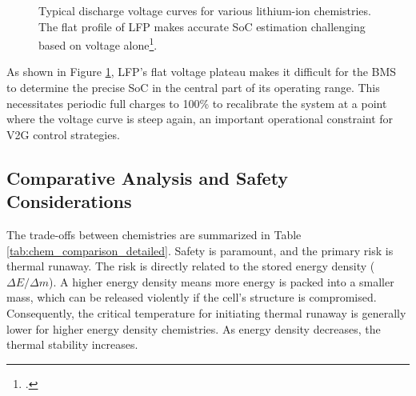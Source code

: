 \begin{figure}[h!]
    \centering
    \caption{Typical discharge voltage curves for various lithium-ion chemistries. The flat profile of LFP makes accurate SoC estimation challenging based on voltage alone\footcite{plett2015battery}.}
    \label{fig:voltage_curves_detailed}
\end{figure}

As shown in Figure \ref{fig:voltage_curves_detailed}, LFP's flat voltage plateau makes it difficult for the BMS to determine the precise SoC in the central part of its operating range. This necessitates periodic full charges to 100\% to recalibrate the system at a point where the voltage curve is steep again, an important operational constraint for V2G control strategies.

\subsection{Comparative Analysis and Safety Considerations}
The trade-offs between chemistries are summarized in Table \ref{tab:chem_comparison_detailed}. Safety is paramount, and the primary risk is thermal runaway. The risk is directly related to the stored energy density ($\Delta E / \Delta m$). A higher energy density means more energy is packed into a smaller mass, which can be released violently if the cell's structure is compromised. Consequently, the critical temperature for initiating thermal runaway is generally lower for higher energy density chemistries. As energy density decreases, the thermal stability increases.

